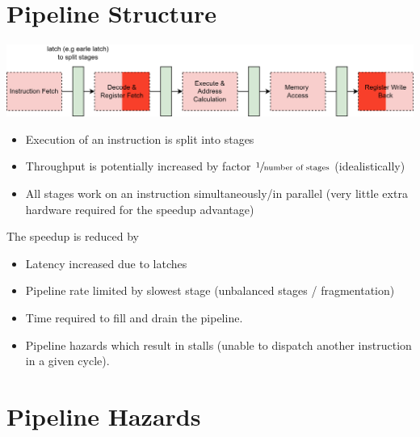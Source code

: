\section{Pipeline Structure}
\begin{center}
	\includegraphics[width=.8\textwidth]{pipelining/images/MIPS_pipeline_stages.drawio.png}
\end{center}
\begin{itemize}
	\item Execution of an instruction is split into stages
	\item Throughput is potentially increased by factor $\sfrac{1}{\text{number of stages}}$ (idealistically)
	\item All stages work on an instruction simultaneously/in parallel (very little extra hardware required for the speedup advantage)
\end{itemize}
The speedup is reduced by
\begin{itemize}
	\item Latency increased due to latches
	\item Pipeline rate limited by slowest stage (unbalanced stages / fragmentation)
	\item Time required to fill and drain the pipeline.
	\item Pipeline hazards which result in stalls (unable to dispatch another instruction in a given cycle).
\end{itemize}

\section{Pipeline Hazards}
